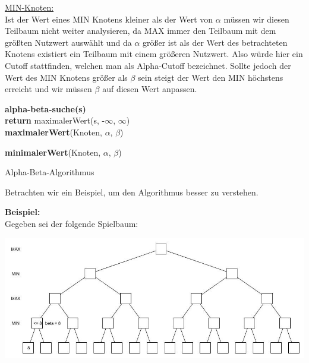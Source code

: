 \underline{MIN-Knoten:}\\
 Ist der Wert eines MIN Knotens kleiner als der Wert von $\alpha$ müssen wir diesen Teilbaum nicht weiter analysieren, da MAX immer den Teilbaum mit dem größten Nutzwert auswählt und da $\alpha$ größer ist als der Wert des betrachteten Knotens existiert ein Teilbaum mit einem größeren Nutzwert. Also würde hier ein Cutoff stattfinden, welchen man als Alpha-Cutoff bezeichnet. Sollte jedoch der Wert des MIN Knotens größer als $\beta$ sein steigt der Wert den MIN höchstens erreicht und wir müssen $\beta$ auf diesen Wert anpassen.


 \begin{algorithm}
 	\textbf{alpha-beta-suche(s)}\\

 	\textbf{return} maximalerWert(s, -$\infty$, $\infty$)\\

 	\textbf{maximalerWert}(Knoten, $\alpha$, $\beta$)\\


	\textbf{minimalerWert}(Knoten, $\alpha$, $\beta$)\\

 	\caption{Alpha-Beta-Algorithmus}
\end{algorithm}

Betrachten wir ein Beispiel, um den Algorithmus besser zu verstehen.

\textbf{Beispiel:}\\

Gegeben sei der folgende Spielbaum:
\begin{center}
	\includegraphics[width = 12 cm]{chapters/minimax/jpg/Alpha-beta1.jpg}
\end{center}

